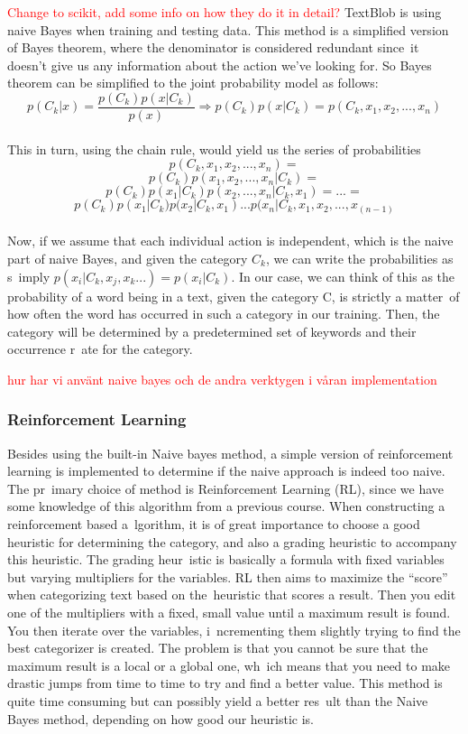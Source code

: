 \documentclass[a4paper]{article}
\begin{document}
\textcolor{red}{Change to scikit, add some info on how they do it in detail?}
TextBlob is using naive Bayes when training and testing data. This method is a simplified version of Bayes theorem, where the denominator is considered redundant since\
 it doesn't give us any information about the action we've looking for. So Bayes theorem can be simplified to the joint probability model as follows:
\\\[p(C_k|x) = \frac{p(C_k)p(x|C_k)}{p(x)} \Longrightarrow p(C_k)p(x|C_k) = p(C_k,x_1,x_2,...,x_n)\]\\
This in turn, using the chain rule, would yield us the series of probabilities \[p(C_k,x_1,x_2,...,x_n) = \]
\[p(C_k)p(x_1,x_2,...,x_n|C_k) =\]
\[p(C_k)p(x_1|C_k)p(x_2,...,x_n|C_k, x_1) = ... =\]
\[p(C_k)p(x_1|C_k)p(x_2|C_k, x_1) ... p(x_n|C_k, x_1, x_2,...,x_(n-1) \]\\
Now, if we assume that each individual action is independent, which is the naive part of naive Bayes, and given the category $C_k$, we can write the probabilities as s\
imply $p(x_i|C_k, x_j,x_k...) = p(x_i|C_k)$. In our case, we can think of this as the probability of a word being in a text, given the category C, is strictly a matter\
 of how often the word has occurred in such a category in our training. Then, the category will be determined by a predetermined set of keywords and their occurrence r\
ate for the category.

\textcolor{red}{hur har vi använt naive bayes och de andra verktygen i våran implementation}
\subsubsection{Reinforcement Learning}
Besides using the built-in Naive bayes method, a simple version of reinforcement learning is implemented to determine if the naive approach is indeed too naive. The pr\
imary choice of method is Reinforcement Learning (RL), since we have some knowledge of this algorithm from a previous course. When constructing a reinforcement based a\
lgorithm, it is of great importance to choose a good heuristic for determining the category, and also a grading heuristic to accompany this heuristic. The grading heur\
istic is basically a formula with fixed variables but varying multipliers for the variables. RL then aims to maximize the ``score'' when categorizing text based on the\
 heuristic that scores a result. Then you edit one of the multipliers with a fixed, small value until a maximum result is found. You then iterate over the variables, i\
ncrementing them slightly trying to find the best categorizer is created. The problem is that you cannot be sure that the maximum result is a local or a global one, wh\
ich means that you need to make drastic jumps from time to time to try and find a better value. This method is quite time consuming but can possibly yield a better res\
ult than the Naive Bayes method, depending on how good our heuristic is.
\end{document}
